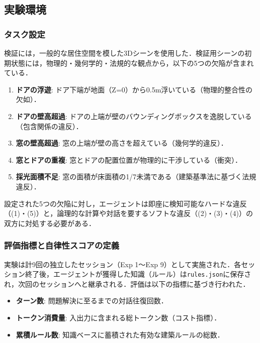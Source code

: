 \documentclass[dvipdfmx, a4paper, 9pt]{deimj}
\begin{document}
\subsection{実験環境}

\subsubsection{タスク設定}

検証には，一般的な居住空間を模した3Dシーンを使用した．検証用シーンの初期状態には，物理的・幾何学的・法規的な観点から，以下の5つの欠陥が含まれている．

\begin{enumerate}
  \item \textbf{ドアの浮遊}: ドア下端が地面（Z=0）から0.5m浮いている（物理的整合性の欠如）．
  \item \textbf{ドアの壁高超過}: ドアの上端が壁のバウンディングボックスを逸脱している（包含関係の違反）．
  \item \textbf{窓の壁高超過}: 窓の上端が壁の高さを超えている（幾何学的違反）．
  \item \textbf{窓とドアの重複}: 窓とドアの配置位置が物理的に干渉している（衝突）．
  \item \textbf{採光面積不足}: 窓の面積が床面積の1/7未満である（建築基準法に基づく法規違反）．
\end{enumerate}

設定された5つの欠陥に対し，エージェントは即座に検知可能なハードな違反（(1)・(5)）と，論理的な計算や対話を要するソフトな違反（(2)・(3)・(4)）の双方に対処する必要がある．

\subsubsection{評価指標と自律性スコアの定義}

実験は計9回の独立したセッション（Exp 1〜Exp 9）として実施された．各セッション終了後，エージェントが獲得した知識（ルール）は\texttt{rules.json}に保存され，次回のセッションへと継承される．評価は以下の指標に基づき行われた．

\begin{itemize}
    \item \textbf{ターン数}: 問題解決に至るまでの対話往復回数．
    \item \textbf{トークン消費量}: 入出力に含まれる総トークン数（コスト指標）．
    \item \textbf{累積ルール数}: 知識ベースに蓄積された有効な建築ルールの総数．
\end{itemize}
\end{document}
